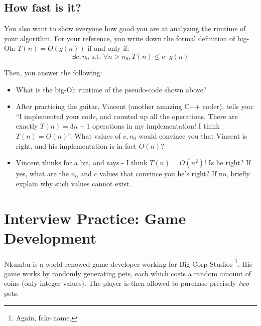 \documentclass [12pt]{article}
\begin{document}

\subsection{How fast is it?}
 You also want to show everyone how good you are at analyzing the runtime of your algorithm. For your reference, you write down the formal definition of big-Oh: $T(n)= O(g(n))$ if and only if:
$$
\exists c, n_0 \text{ s.t. } \forall n > n_0, T(n) \leq c \cdot g(n)
$$

Then, you answer the following:
\begin{itemize}
    \item {} What is the big-Oh runtime of the pseudo-code shown above?
    \item {} After practicing the guitar, Vincent (another amazing C++ coder),  tells you: ``I implemented your code, and counted up all the operations. There are exactly $T(n) = 3n + 1$ operations in my implementation! I think $T(n) = O(n)$''. What values of $c, n_0$ would convince you that Vincent is right, and his implementation is in-fact $O(n)$?
    \item {} Vincent thinks for a bit, and says - I think $T(n) = O(n^2)$! Is he right? If yes, what are the $n_0$ and $c$ values that convince you he's right? If no, briefly explain why such values cannot exist.
\end{itemize}




\pagebreak
\section{Interview Practice: Game Development}
 Nkumbu is a world-renowed game developer working for Big Corp Studios \footnote{Again, fake name.}. His game works by randomly generating pets, each which costs a random amount of coins (only integer values). The player is then allowed to purchase precisely \textit{two} pets. 
\end{document}
